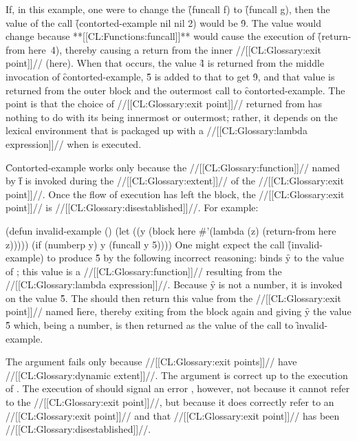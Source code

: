 If, in this example, one were to change the \f{(funcall f)} to
\f{(funcall g)}, then the value of the call \f{(contorted-example nil nil 2)}
would be \f{9}.  The value would change because 
**[[CL:Functions:funcall]]** would cause the
execution of \f{(return-from here\ssst\ 4)}, thereby causing
a return from the inner //[[CL:Glossary:exit point]]// (here\ssst).
When that occurs, the value \f{4} is returned from the
middle invocation of \f{contorted-example}, \f{5} is added to that
to get \f{9}, and that value is returned from the outer block
and the outermost call to \f{contorted-example}.  The point
is that the choice of //[[CL:Glossary:exit point]]//
returned from has nothing to do with its
being innermost or outermost; rather,
it depends on the lexical environment
that is packaged up with a //[[CL:Glossary:lambda expression]]// when
 is executed.
                                  
\endSubsection%


\f{Contorted-example} works only because the
//[[CL:Glossary:function]]// named by \f{f} is invoked during the //[[CL:Glossary:extent]]// of the 
//[[CL:Glossary:exit point]]//.
Once the flow of execution has left the block,
the //[[CL:Glossary:exit point]]// is //[[CL:Glossary:disestablished]]//.  For example:

\code
 (defun invalid-example ()
   (let ((y (block here #'(lambda (z) (return-from here z)))))
     (if (numberp y) y (funcall y 5))))
\endcode
One might expect the call \f{(invalid-example)} to produce \f{5}
by the following incorrect reasoning:
 binds \f{y} to the
value of ; this value is a //[[CL:Glossary:function]]// resulting
from the //[[CL:Glossary:lambda expression]]//.  Because \f{y} is not a number, it is
invoked on the value \f{5}.  The  should then
return this value from the                      
//[[CL:Glossary:exit point]]// named \f{here}, thereby
exiting from the block again and giving \f{y} the value \f{5}
which, being a number, is then returned as the value of the call
to \f{invalid-example}.


The argument fails only because //[[CL:Glossary:exit points]]// have 
//[[CL:Glossary:dynamic extent]]//.  The argument is correct up to the execution of
.  The execution of 
should signal an error , however, not
because it cannot refer to the //[[CL:Glossary:exit point]]//, but because it
does correctly refer to an //[[CL:Glossary:exit point]]// and that 
//[[CL:Glossary:exit point]]// has been //[[CL:Glossary:disestablished]]//.



